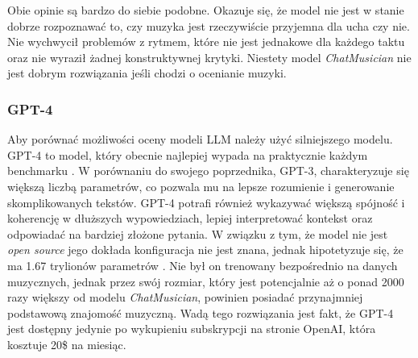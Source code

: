 \documentclass[data-science]{agh-wi} %
\begin{document}
Obie opinie są bardzo do siebie podobne. Okazuje się, że model nie jest w stanie dobrze rozpoznawać to, czy muzyka jest rzeczywiście przyjemna dla ucha czy nie. Nie wychwycił problemów z rytmem, które nie jest jednakowe dla każdego taktu oraz nie wyraził żadnej konstruktywnej krytyki. Niestety model \textit{ChatMusician} nie jest dobrym rozwiązania jeśli chodzi o ocenianie muzyki.

\subsubsection*{GPT-4}
Aby porównać możliwości oceny modeli LLM należy użyć silniejszego modelu. GPT-4 to model, który obecnie najlepiej wypada na praktycznie każdym benchmarku \cite{openai2024gpt4}. W porównaniu do swojego poprzednika, GPT-3, charakteryzuje się większą liczbą parametrów, co pozwala mu na lepsze rozumienie i generowanie skomplikowanych tekstów. GPT-4 potrafi również wykazywać większą spójność i koherencję w dłuższych wypowiedziach, lepiej interpretować kontekst oraz odpowiadać na bardziej złożone pytania. W związku z tym, że model nie jest \textit{open source} jego dokłada konfiguracja nie jest znana, jednak hipotetyzuje się, że ma 1.67 trylionów parametrów \cite{leakgpt4}. Nie był on trenowany bezpośrednio na danych muzycznych, jednak przez swój rozmiar, który jest potencjalnie aż o ponad 2000 razy większy od modelu \textit{ChatMusician}, powinien posiadać przynajmniej podstawową znajomość muzyczną. Wadą tego rozwiązania jest fakt, że GPT-4 jest dostępny jedynie po wykupieniu subskrypcji na stronie OpenAI, która kosztuje 20\$ na miesiąc.
\end{document}
